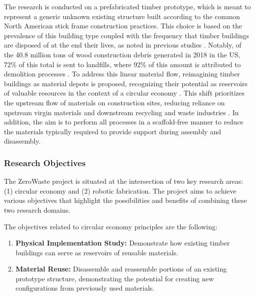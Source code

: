     The research is conducted on a prefabricated timber prototype, which is meant to represent a generic unknown existing structure built according to the common North American stick frame construction practices. This choice is based on the prevalence of this building type coupled with the frequency that timber buildings are disposed of at the end their lives, as noted in previous studies \citep{obrien_life_2006, diyamandoglu_deconstruction_2015}. Notably, of the 40.8 million tons of wood construction debris generated in 2018 in the US, 72\% of this total is sent to landfills, where 92\% of this amount is attributed to demolition processes \citep{us_epa_advancing_2020}. To address this linear material flow, reimagining timber buildings as material depots is proposed, recognizing their potential as reservoirs of valuable resources in the context of a circular economy \citep{zimmann_circular_2016}. This shift prioritizes the upstream flow of materials on construction sites, reducing reliance on upstream virgin materials and downstream recycling and waste industries \citep{garcia_material_2021}. In addition, the aim is to perform all processes in a scaffold-free manner to reduce the materials typically required to provide support during assembly and disassembly.


    \subsubsection{Research Objectives}
        The ZeroWaste project is situated at the intersection of two key research areas: (1) circular economy and (2) robotic fabrication. The project aims to achieve various objectives that highlight the possibilities and benefits of combining these two research domains.
        
        The objectives related to circular economy principles are the following:
        \begin{enumerate}
            \item \textbf{Physical Implementation Study:} Demonstrate how existing timber buildings can serve as reservoirs of reusable materials.
            \item \textbf{Material Reuse:} Disassemble and reassemble portions of an existing prototype structure, demonstrating the potential for creating new configurations from previously used materials.
        \end{enumerate}
        
